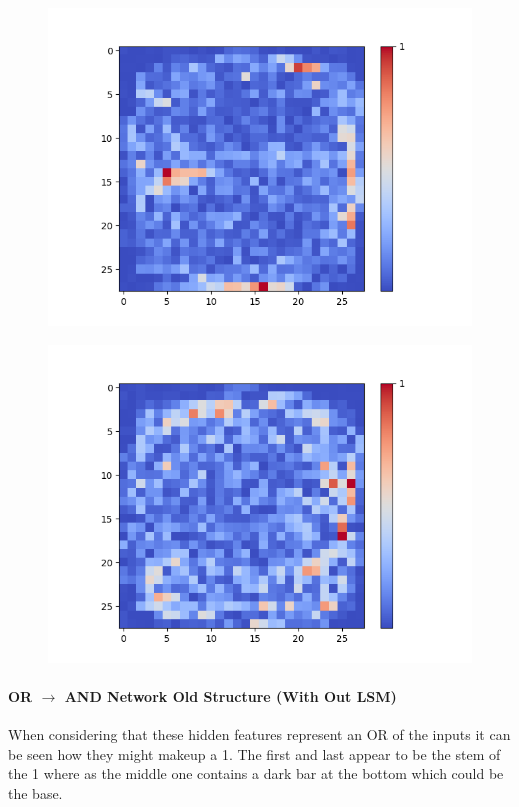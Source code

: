 \begin{figure}[H]
\begin{minipage}[b]{0.19\textwidth}
		\includegraphics[width=\textwidth]{Sigmoid(Hidden-Layer)/Layer0-Neuron-24.png}
		\label{}
	\end{minipage}
	\begin{minipage}[b]{0.19\textwidth}
		\includegraphics[width=\textwidth]{Sigmoid(Hidden-Layer)/Layer0-Neuron-28.png}
		\label{}
	\end{minipage}
	\caption{}
	\hfill
\end{figure}

\paragraph{OR $\rightarrow$ AND Network Old Structure (With Out LSM)}
When considering that these hidden features represent an OR of the inputs it can be seen how they might makeup a 1. The first and last appear to be the stem of the 1 where as the middle one contains a dark bar at the bottom which could be the base.

